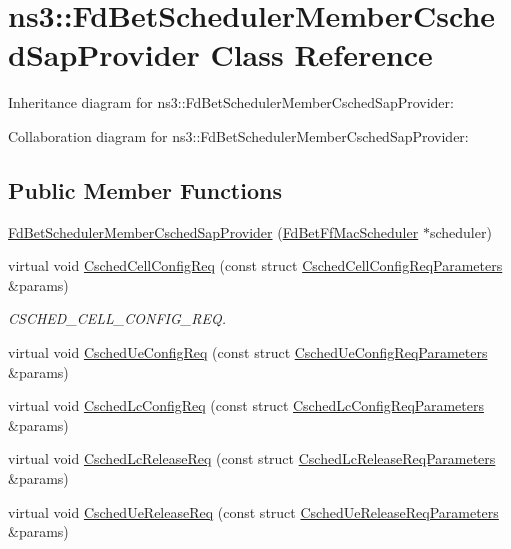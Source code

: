 \hypertarget{classns3_1_1FdBetSchedulerMemberCschedSapProvider}{}\section{ns3\+:\+:Fd\+Bet\+Scheduler\+Member\+Csched\+Sap\+Provider Class Reference}
\label{classns3_1_1FdBetSchedulerMemberCschedSapProvider}


Inheritance diagram for ns3\+:\+:Fd\+Bet\+Scheduler\+Member\+Csched\+Sap\+Provider\+:


Collaboration diagram for ns3\+:\+:Fd\+Bet\+Scheduler\+Member\+Csched\+Sap\+Provider\+:
\subsection*{Public Member Functions}
\begin{DoxyCompactItemize}
\item 
\hyperlink{classns3_1_1FdBetSchedulerMemberCschedSapProvider_a4b7f158ec1ea91b6ce1253e7996b325b}{Fd\+Bet\+Scheduler\+Member\+Csched\+Sap\+Provider} (\hyperlink{classns3_1_1FdBetFfMacScheduler}{Fd\+Bet\+Ff\+Mac\+Scheduler} $\ast$scheduler)
\item 
virtual void \hyperlink{classns3_1_1FdBetSchedulerMemberCschedSapProvider_acbc803d12b82eea5b5a1ac8674924cda}{Csched\+Cell\+Config\+Req} (const struct \hyperlink{structns3_1_1FfMacCschedSapProvider_1_1CschedCellConfigReqParameters}{Csched\+Cell\+Config\+Req\+Parameters} \&params)
\begin{DoxyCompactList}\small\item\em C\+S\+C\+H\+E\+D\+\_\+\+C\+E\+L\+L\+\_\+\+C\+O\+N\+F\+I\+G\+\_\+\+R\+EQ. \end{DoxyCompactList}\item 
virtual void \hyperlink{classns3_1_1FdBetSchedulerMemberCschedSapProvider_ab895c4b069874549b09cf5a71711bbe9}{Csched\+Ue\+Config\+Req} (const struct \hyperlink{structns3_1_1FfMacCschedSapProvider_1_1CschedUeConfigReqParameters}{Csched\+Ue\+Config\+Req\+Parameters} \&params)
\item 
virtual void \hyperlink{classns3_1_1FdBetSchedulerMemberCschedSapProvider_a60ea6610a5ea5af0647a66fcb91a283f}{Csched\+Lc\+Config\+Req} (const struct \hyperlink{structns3_1_1FfMacCschedSapProvider_1_1CschedLcConfigReqParameters}{Csched\+Lc\+Config\+Req\+Parameters} \&params)
\item 
virtual void \hyperlink{classns3_1_1FdBetSchedulerMemberCschedSapProvider_abd8c75f6beda3d22e144cbdf0fdd9761}{Csched\+Lc\+Release\+Req} (const struct \hyperlink{structns3_1_1FfMacCschedSapProvider_1_1CschedLcReleaseReqParameters}{Csched\+Lc\+Release\+Req\+Parameters} \&params)
\item 
virtual void \hyperlink{classns3_1_1FdBetSchedulerMemberCschedSapProvider_a05516802dbb32e8b8edd625f8dbfba0f}{Csched\+Ue\+Release\+Req} (const struct \hyperlink{structns3_1_1FfMacCschedSapProvider_1_1CschedUeReleaseReqParameters}{Csched\+Ue\+Release\+Req\+Parameters} \&params)
\end{DoxyCompactItemize}
